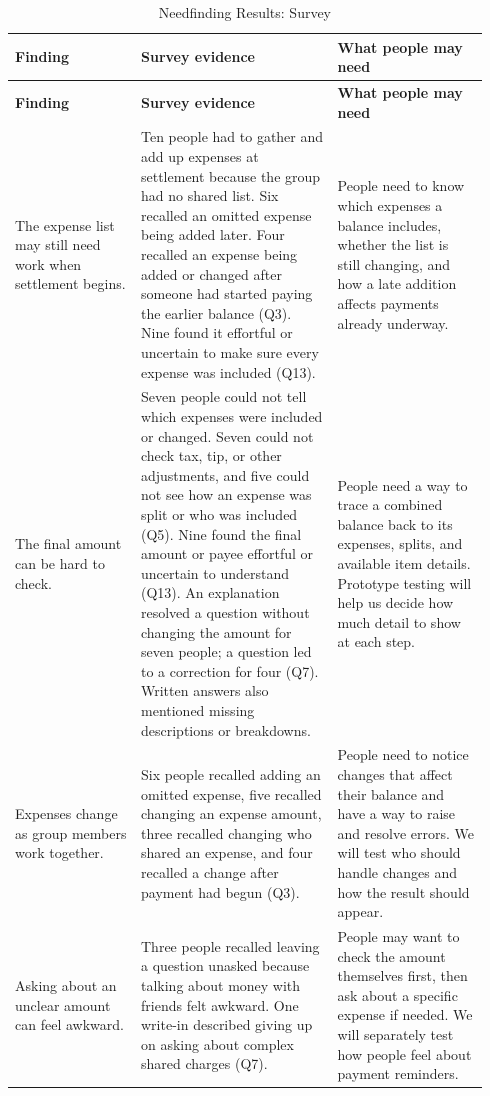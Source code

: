 \documentclass[letterpaper]{jdf}
\begin{document}
{\footnotesize
\setlength{\tabcolsep}{3pt}
\renewcommand{\arraystretch}{1.17}
\begin{longtable}{@{}>{\raggedright\arraybackslash}p{0.25\linewidth}>{\raggedright\arraybackslash}p{0.39\linewidth}>{\raggedright\arraybackslash}p{0.30\linewidth}@{}}
\caption{Needfinding Results: Survey}\label{tab:needfinding-survey}\\
\toprule[0.5pt]
\textbf{Finding} & \textbf{Survey evidence} & \textbf{What people may need} \\
\midrule
\endfirsthead
\toprule[0.5pt]
\textbf{Finding} & \textbf{Survey evidence} & \textbf{What people may need} \\
\midrule
\endhead
\endfoot
\bottomrule
\endlastfoot
The expense list may still need work when settlement begins. & Ten people had to gather and add up expenses at settlement because the group had no shared list. Six recalled an omitted expense being added later. Four recalled an expense being added or changed after someone had started paying the earlier balance (Q3). Nine found it effortful or uncertain to make sure every expense was included (Q13). & People need to know which expenses a balance includes, whether the list is still changing, and how a late addition affects payments already underway. \\
\midrule
The final amount can be hard to check. & Seven people could not tell which expenses were included or changed. Seven could not check tax, tip, or other adjustments, and five could not see how an expense was split or who was included (Q5). Nine found the final amount or payee effortful or uncertain to understand (Q13). An explanation resolved a question without changing the amount for seven people; a question led to a correction for four (Q7). Written answers also mentioned missing descriptions or breakdowns. & People need a way to trace a combined balance back to its expenses, splits, and available item details. Prototype testing will help us decide how much detail to show at each step. \\
\midrule
Expenses change as group members work together. & Six people recalled adding an omitted expense, five recalled changing an expense amount, three recalled changing who shared an expense, and four recalled a change after payment had begun (Q3). & People need to notice changes that affect their balance and have a way to raise and resolve errors. We will test who should handle changes and how the result should appear. \\
\midrule
Asking about an unclear amount can feel awkward. & Three people recalled leaving a question unasked because talking about money with friends felt awkward. One write-in described giving up on asking about complex shared charges (Q7). & People may want to check the amount themselves first, then ask about a specific expense if needed. We will separately test how people feel about payment reminders. \\

\end{longtable}}
\end{document}
